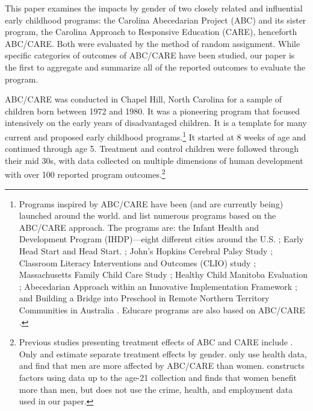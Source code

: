 This paper examines the impacts by gender of two closely related and influential early childhood programs: the Carolina Abecedarian Project (ABC) and its sister program, the Carolina Approach to Responsive Education (CARE), henceforth ABC/CARE. Both were evaluated by the method of random assignment. While specific categories of outcomes of ABC/CARE have been studied, our paper is the first to aggregate and summarize all of the reported outcomes to evaluate the program.

ABC/CARE was conducted in Chapel Hill, North Carolina for a sample of children born between 1972 and 1980. It was a pioneering program that focused intensively on the early years of disadvantaged children. It is a template for many current and proposed early childhood programs.\footnote{Programs inspired by ABC/CARE have been (and are currently being) launched around the world. \citet{Sparling_2010_Highlights} and \citet{Ramey_Ramey_Lanzi_2014_Interventions} list numerous programs based on the ABC/CARE approach. The programs are: the Infant Health and Development Program (IHDP)---eight different cities around the U.S. \citep{Spiker-etal_1997_Helping}; Early Head Start and Head Start. \citep{Schneider_McDonald-eds_2007_Scale-Up_Vol-1}; John's Hopkins Cerebral Palsy Study \citep{Sparling_2010_Highlights}; Classroom Literacy Interventions and Outcomes (CLIO) study \citep{Sparling_2010_Highlights}; Massachusetts Family Child Care Study \citep{Collins_etal_2010_Massachusetts-Study}; Healthy Child Manitoba Evaluation \citep{Healthy_Child_Manitoba_2015_Starting-Early}; Abecedarian Approach within an Innovative Implementation Framework \citep{Jensen_Nielsen_2016_ABC-Programme-Pilot}; and Building a Bridge into Preschool in Remote Northern Territory Communities in Australia \citep{UMonash_Dataset_2015_URL}. Educare programs are also based on ABC/CARE \citep{Educare_2014_Research_Agenda,Yazejian_Bryant_2012_Educare}.} It started at 8 weeks of age and continued through age 5. Treatment and control children were followed through their mid 30s, with data collected on multiple dimensions of human development with over 100 reported program outcomes.\footnote{Previous studies presenting treatment effects of ABC and CARE include \citet{Ramey_etal_1985_Project-CARE_TiECSE,Clarke_Campbell_1998_ABC_Comparison_ECRQ,Campbell_Pungello_etal_2001_DP,Campbell_Ramey_etal_2002_ADS,Anderson_2008_JASA,Campbell_Wasik_etal_2008_ECRQ,Campbell_Conti_etal_2014_EarlyChildhoodInvestments}. Only \citet{Anderson_2008_JASA} and \citet{Campbell_Conti_etal_2014_EarlyChildhoodInvestments} estimate separate treatment effects by gender. \citet{Campbell_Conti_etal_2014_EarlyChildhoodInvestments} only use health data, and find that men are more affected by ABC/CARE than women. \citet{Anderson_2008_JASA} constructs factors using data up to the age-21 collection and finds that women benefit more than men, but does not use the crime, health, and employment data used in our paper. }

